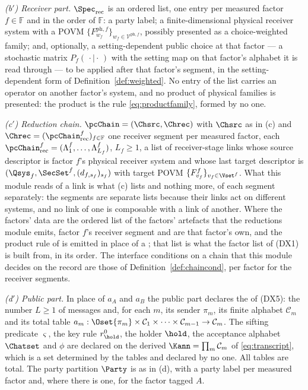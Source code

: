 \begin{definition}
\emph{(b$'$) Receiver part.} $\Spec_{\mathrm{rec}}$ is an ordered list, one
entry per measured factor $f\in\mathbb{F}$ and in the order of $\mathbb{F}$: a
party label; a finite-dimensional physical receiver system with a POVM
$\{F^{\mathrm{ph},f}_{w_f}\}_{w_f\in\mathcal{V}^{\mathrm{ph},f}}$, possibly
presented as a choice-weighted family; and, optionally, a
setting-dependent public choice at that factor --- a stochastic matrix
$P_f(\,\cdot\mid\cdot\,)$ with the setting map on that factor's alphabet it is
read through --- to be applied after that factor's segment, in the
setting-dependent form of Definition~\ref{def:weighted}. No entry of the list
carries an operator on another factor's system, and no product of physical
families is presented: the product is the rule \eqref{eq:productfamily},
formed by no one.

\emph{(c$'$) Reduction chain.} $\pcChain=(\Chsrc,\Chrec)$ with $\Chsrc$ as
in (c) and $\Chrec=(\pcChain^{f}_{\mathrm{rec}})_{f\in\mathbb{F}}$ one
receiver segment per measured factor, each
$\pcChain^{f}_{\mathrm{rec}}=(\Lambda^{f}_1,\dots,\Lambda^{f}_{L_f})$,
$L_f\ge1$, a list of receiver-stage links whose source descriptor is factor
$f$'s physical receiver system and whose last target descriptor is
$(\Qsys_f,\SecSet^{f},(d_{f,s_f})_{s_f})$ with target POVM
$\{F^{f}_{v_f}\}_{v_f\in\Vset^{f}}$. What this module reads of a link is what
(c) lists and nothing more, of each segment separately: the segments are
separate lists because their links act on different systems, and no link of
one is composable with a link of another. Where the factors' data are the
ordered list of the factors' artefacts that the reductions module emits,
factor $f$'s receiver segment and  are that factor's
own, and the product rule of  is
emitted in place of a ; that list
is what the factor list of (DX1) is built from, in its order. The interface
conditions on a chain that this module decides on the record are those of
Definition~\ref{def:chaincond}, per factor for the receiver segments.

\emph{(d$'$) Public part.} In place of $a_A$ and $a_B$ the public part
declares the  of (DX5): the number $L\ge1$ of messages and,
for each $m$, its sender $\pi_m$, its finite alphabet $\mathcal{C}_m$ and
its total table
$a_m:\Oset{\pi_m}\times\mathcal{C}_1\times\dots\times\mathcal{C}_{m-1}
\to\mathcal{C}_m$. The sifting predicate $\varsigma$, the key rule
$r^{0}_{\hold}$, the holder $\hold$, the acceptance alphabet $\Chatset$ and
$\phi$ are declared on the derived $\Kann=\prod_{m}\mathcal{C}_m$ of
\eqref{eq:transcript}, which is a set determined by the tables and declared by
no one. All tables are total. The party partition $\Party$ is as in (d), with
a party label per measured factor and, where there is one, for the factor
tagged $A$.


\end{definition}
